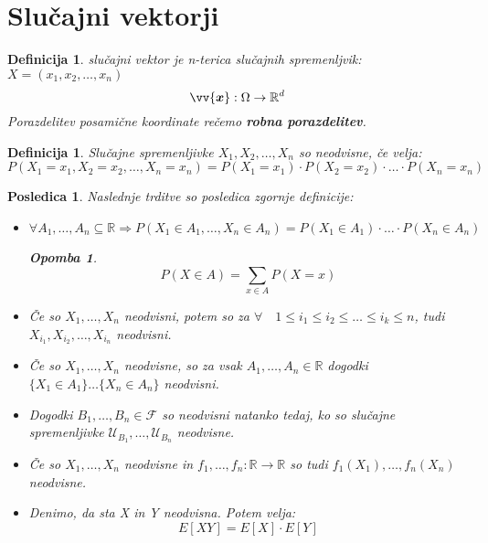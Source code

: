 \documentclass[11pt]{article}
\newtheorem{Posledica}[Izrek]{{\sc Posledica}}
\newtheorem{Definicija}[Izrek]{{\sc Definicija}}
\newtheorem{Opomba}[Izrek]{{\sc Opomba}}
\begin{document}
	\section{Slučajni vektorji}
	\begin{Definicija}
		slučajni vektor je n-terica slučajnih spremenljvik: $X = (x_1, x_2,\dots , x_n)$
		$$ \vv{\bm{x}}: \Omega \to \mathbb{R}^d$$
		Porazdelitev posamične koordinate rečemo \textbf{robna porazdelitev}.
	\end{Definicija}
	\begin{Definicija}
		Slučajne spremenljivke $X_1,X_2, \dots , X_n$ so neodvisne, če velja:
		$$P(X_1 = x_1, X_2 = x_2,\dotsc, X_n = x_n) = P(X_1 = x_1) \cdot P(X_2 = x_2) \cdot \dotsc \cdot P(X_n = x_n)$$
	\end{Definicija}
	\begin{Posledica}
		Naslednje trditve so posledica zgornje definicije:
		\begin{itemize}
			\item
			$\forall A_1,\dotsc, A_n \subseteq \mathbb{R} \Rightarrow P(X_1 \in A_1, \dotsc, X_n\in A_n) = P(X_1 \in A_1) \cdot \dotsc \cdot P(X_n \in A_n)$
			\begin{Opomba}
				$$P(X\in A ) = \sum_{x\in A}{P(X = x)}$$
			\end{Opomba}
			\item
			Če so $X_1, \dotsc ,X_n$ neodvisni, potem so za $\forall \quad 1\le i_1 \le i_2 \le \dotsc \le i_k\le n$, tudi $X_{i_1}, X_{i_2},\dotsc, X_{i_n}$ neodvisni.
			\item
			Če so $X_1, \dotsc ,X_n$ neodvisne, so za vsak $ A_1,\dotsc, A_n \in \mathbb{R}$ dogodki
			\\
			$\{X_1\in A_1\}\dotsc \{X_n\in A_n \}$ neodvisni.
			\item
			Dogodki $B_1, \dotsc, B_n \in \mathcal{F}$ so neodvisni natanko tedaj, ko so slučajne spremenljivke $ \mathcal{U}_{B_1},\dotsc, \mathcal{U}_{B_n}$ neodvisne.
			\item
			Če so $X_1, \dotsc, X_n$ neodvisne in $f_1,\dotsc,f_n : \mathbb{R} \to \mathbb{R}$ so tudi $f_1(X_1),\dotsc, f_n(X_n)$ neodvisne.
			\item
			Denimo, da sta X in Y neodvisna. Potem velja:
			$$E[XY] = E[X] \cdot E[Y]$$
		\end{itemize}
	\end{Posledica}
\end{document}
